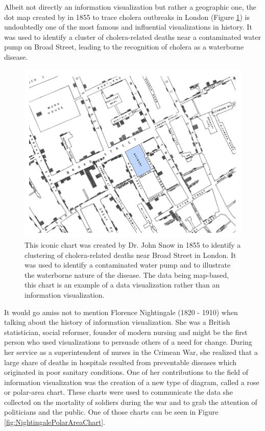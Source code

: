 Albeit not directly an information visualization but rather a geographic one, the dot map created by \cite{ModeOfCommunicationOfCholera} in 1855 to trace cholera outbreaks in London (Figure \ref{fig:CholeraDotMap}) is undoubtedly one of the most famous and influential visualizations in history. It was used to identify a cluster of cholera-related deaths near a contaminated water pump on Broad Street, leading to the recognition of cholera as a waterborne disease.

\begin{figure}[tp]
    \centering
    \includegraphics[keepaspectratio,width=\linewidth,height=\fullh / 3]
    {images/cholera-dot-map.png}
    \caption[Dot Map Plotting Cholera Deaths in London From 1855]{
        This iconic chart was created by Dr. John Snow in 1855 to identify a clustering of cholera-related deaths near Broad Street in London. It was used to identify a contaminated water pump and to illustrate the waterborne nature of the disease. The data being map-based, this chart is an example of a data visualization rather than an information visualization. 
    }
    \label{fig:CholeraDotMap}
\end{figure}

It would go amiss not to mention Florence Nightingale (1820 - 1910) \parencite{FlorenceNightingale} when talking about the history of information visualization. She was a British statistician, social reformer, founder of modern nursing and might be the first person who used visualizations to persuade others of a need for change. During her service as a superintendent of nurses in the Crimean War, she realized that a large share of deaths in hospitals resulted from preventable diseases which originated in poor sanitary conditions. One of her contributions to the field of information visualization was the creation of a new type of diagram, called a rose or polar-area chart. These charts were used to communicate the data she collected on the mortality of soldiers during the war and to grab the attention of politicians and the public. One of those charts can be seen in Figure \ref{fig:NightingalePolarAreaChart}.

